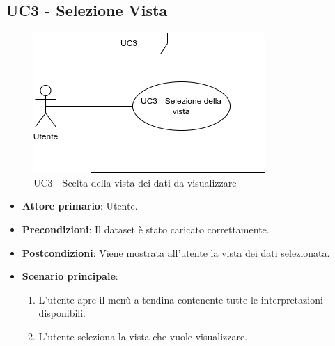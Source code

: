 

\subsection{UC3 - Selezione Vista}
\label{sec:UC6}
\begin{figure}[h!]
    \centering
    \includegraphics[scale=0.55]{../../assets/scelta_vista.png}
    \caption{UC3 - Scelta della vista dei dati da visualizzare}
\end{figure}
\begin{itemize}
    \item \textbf{Attore primario}: Utente.
    \item \textbf{Precondizioni}: Il dataset è stato caricato correttamente.
    \item \textbf{Postcondizioni}: Viene mostrata all'utente la vista dei dati selezionata.
    \item \textbf{Scenario principale}:
          \begin{enumerate}
              \item L'utente apre il menù a tendina contenente tutte le interpretazioni disponibili.
              \item L'utente seleziona la vista che vuole visualizzare.
          \end{enumerate}
\end{itemize}
\newpage


